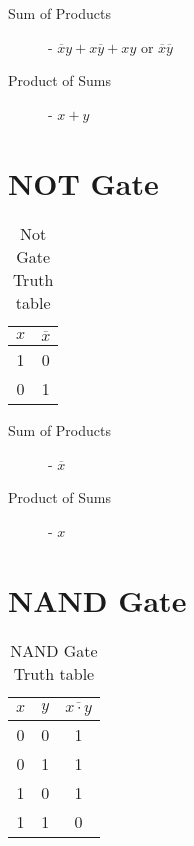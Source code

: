 \documentclass[12pt letter]{report}
\begin{document}
\begin{description}
  \item[Sum of Products]  - $\overline{x}y + x\overline{y} + xy $ or $\overline{x}\overline{y}$
  \item[Product of Sums] - $x + y$
\end{description}

\section{NOT Gate}

\begin{table}[h!]
  \caption{Not Gate Truth table}\label{tab:not}
  \begin{center}
    \begin{tabular}{|c|c|}
      \hline
      $x$ & $\overline{x}$ \\ [0.5ex]
      \hline
      \hline
      1   & 0              \\
      0   & 1              \\
      \hline
    \end{tabular}
  \end{center}
\end{table}
\begin{description}
  \item[Sum of Products]  - $\overline{x}$
  \item[Product of Sums] - $x$
\end{description}

\section{NAND Gate}

\begin{table}[h!]
  \caption{NAND Gate Truth table}\label{tab:nand}
  \begin{center}
    \begin{tabular}{|c c|c|}
      \hline
      $x$ & $y$ & $\overline{x \cdot y}$ \\ [0.5ex]
      \hline
      \hline
      0   & 0   & 1                      \\
      0   & 1   & 1                      \\
      1   & 0   & 1                      \\
      1   & 1   & 0                      \\
      \hline
    \end{tabular}
  \end{center}
\end{table}
\end{document}
